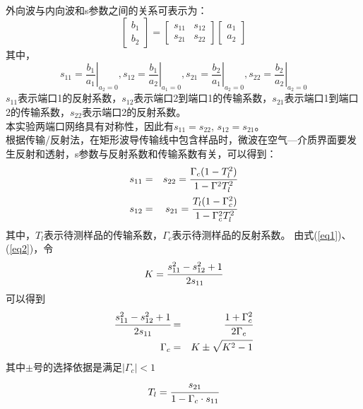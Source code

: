 \documentclass[a4paper]{article}
\begin{document}
外向波与内向波和s参数之间的关系可表示为：
\begin{equation}
\begin{bmatrix}
b_1 \\
b_2
\end{bmatrix}
= 
\begin{bmatrix}
s_{11} & s_{12}\\
s_{21} & s_{22}
\end{bmatrix}
\begin{bmatrix}
a_1\\
a_2
\end{bmatrix}
\end{equation}
其中，
\begin{equation}
s_{11} = \left.\frac{b_1}{a_1}\right|_{a_2=0}, 
s_{12} = \left.\frac{b_1}{a_2}\right|_{a_1=0}, 
s_{21} = \left.\frac{b_2}{a_1}\right|_{a_2=0}, 
s_{22} = \left.\frac{b_2}{a_2}\right|_{a_2=0}
\end{equation}
$s_{11}$表示端口1的反射系数，$s_{12}$表示端口2到端口1的传输系数，$s_{21}$表示端口1到端口2的传输系数，$s_{22}$表示端口2的反射系数。\\
本实验两端口网络具有对称性，因此有$s_{11}=s_{22}$, $s_{12}=s_{21}$。\\
根据传输/反射法，在矩形波导传输线中包含样品时，微波在空气—介质界面要发生反射和透射，s参数与反射系数和传输系数有关，可以得到：
\begin{eqnarray}
s_{11} &=& s_{22} = \cfrac{\Gamma_c(1-T_l^2)}{1-\Gamma^2T^2_l}\label{eq1}\\
s_{12} &=& s_{21} = \cfrac{T_l(1-\Gamma_c^2)}{1-\Gamma_c^2T_l^2}\label{eq2}
\end{eqnarray}
其中，$T_l$表示待测样品的传输系数，$\Gamma_c$表示待测样品的反射系数。
由式(\ref{eq1})、(\ref{eq2})，令
\begin{equation}
K = \cfrac{s_{11}^2-s_{12}^2+1}{2s_{11}}
\end{equation}
可以得到
\begin{eqnarray}
\cfrac{s_{11}^2-s_{12}^2+1}{2s_{11}} &=& \cfrac{1+\Gamma_c^2}{2\Gamma_c}\\
\Gamma_c &=& K\pm\sqrt{K^2-1}
\end{eqnarray}
其中$\pm$号的选择依据是满足$|\Gamma_c|<1$
\begin{equation}
T_l = \cfrac{s_{21}}{1-\Gamma_c\cdot s_{11}}
\end{equation}
\end{document}
